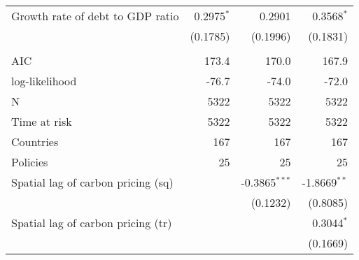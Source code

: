 \begin{tabular}{lrrr}
Growth rate of debt to GDP ratio   &      0.2975$^{*}$ &             0.2901 &      0.3568$^{*}$ \\
                                   &          (0.1785) &           (0.1996) &          (0.1831) \\
                                   &                   &                    &                   \\
AIC                                &             173.4 &              170.0 &             167.9 \\
log-likelihood                     &             -76.7 &              -74.0 &             -72.0 \\
N                                  &              5322 &               5322 &              5322 \\
Time at risk                       &              5322 &               5322 &              5322 \\
Countries                          &               167 &                167 &               167 \\
Policies                           &                25 &                 25 &                25 \\
Spatial lag of carbon pricing (sq) &                   &  -0.3865$^{* * *}$ &   -1.8669$^{* *}$ \\
                                   &                   &           (0.1232) &          (0.8085) \\
Spatial lag of carbon pricing (tr) &                   &                    &      0.3044$^{*}$ \\
                                   &                   &                    &          (0.1669) \\
\bottomrule
\end{tabular}
